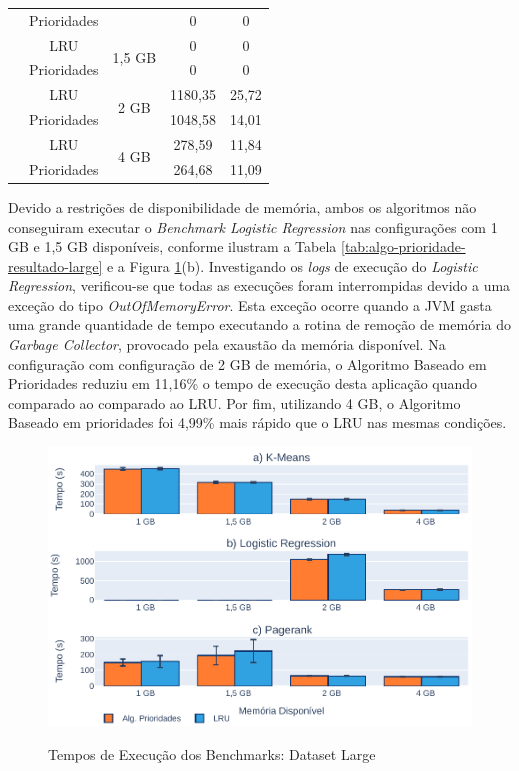\begin{table}[!ht]
{\begin{tabular}{ccccc}
         & Prioridades &  & 0 & 0 \\ \cline{2-5} 
         & LRU & \multirow{2}{*}{1,5 GB} & 0 & 0 \\
         & Prioridades &  & 0 & 0 \\ \cline{2-5} 
         & LRU & \multirow{2}{*}{2 GB} & 1180,35 & 25,72 \\
         & Prioridades &  & 1048,58 & 14,01 \\ \cline{2-5} 
         & LRU & \multirow{2}{*}{4 GB} & 278,59 & 11,84 \\
         & Prioridades &  & 264,68 & 11,09 \\ \hline
    \end{tabular}
    }
\end{table}

Devido a restrições de disponibilidade de memória, ambos os algoritmos não conseguiram executar o \textit{Benchmark Logistic Regression} nas configurações com 1 GB e 1,5 GB disponíveis, conforme ilustram a Tabela \ref{tab:algo-prioridade-resultado-large}
e a Figura  \ref{fig:algo-prioridade-resultado-large}(b). Investigando os \textit{logs} de execução do \textit{Logistic Regression}, verificou-se que todas as execuções foram interrompidas devido a uma exceção do tipo \textit{OutOfMemoryError}. Esta exceção ocorre quando a JVM gasta uma grande quantidade de tempo executando a rotina de remoção de memória do \textit{Garbage Collector}, provocado pela exaustão da memória disponível. Na configuração com configuração de 2 GB de memória, o Algoritmo Baseado em Prioridades reduziu em 11,16\% o tempo de execução desta aplicação quando comparado ao comparado ao LRU. Por fim, utilizando 4 GB, o Algoritmo Baseado em prioridades foi 4,99\% mais rápido que o LRU nas mesmas condições.


\begin{figure}[!ht]
    \centering
    \caption{Tempos de Execução dos Benchmarks: Dataset Large}
    \includegraphics[scale=0.85]{imagens/resultados-dateset-large.pdf}
    \label{fig:algo-prioridade-resultado-large}
\end{figure}

